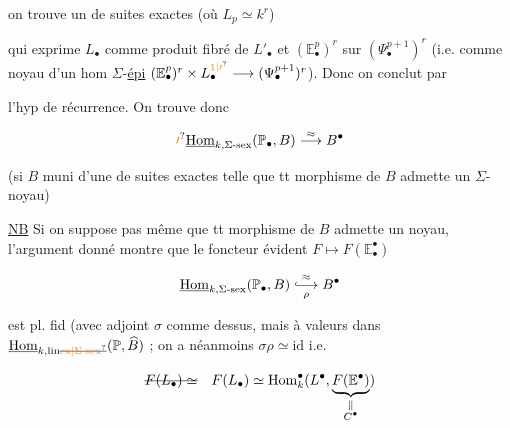 on trouve un  de suites exactes (où $L_p\simeq k^r$)


qui exprime $L_{\bullet}$ comme produit fibré de $L'_{\bullet}$ et $(\mathbb E_{\bullet}^{p})^r$ sur $(\Psi_{\bullet}^{p+1})^r$ (i.e. comme noyau d'un hom  $\Sigma$-\uline{épi} $(\mathbb E_{\bullet}^{p})^{r}\times L_{\bullet}^{\unsure{1|\prime}}\longrightarrow(\Psi_{\bullet}^{p+1})^{r}$). Donc on conclut par


l'hyp de récurrence. On trouve donc

\[
 \unsure{\prime}\underline{\operatorname{Hom}}_{k,\Sigma\text{-}\mathrm{sex}}(\mathbb P_{\bullet},B)\overset{\approx}{\longrightarrow} B^{\bullet}
\]

(si $B$ muni d'une   de suites exactes telle que tt morphisme de $B$ admette un $\Sigma$-noyau)

\uline{NB} Si on  suppose  pas même que tt morphisme de $B$ admette un noyau, l'argument donné montre  que le foncteur évident $F\longmapsto F(\mathbb E_{\bullet}^{\bullet})$

\[
 \underline{\operatorname{Hom}}_{k,\Sigma\text{-}\mathrm{sex}}(\mathbb P_{\bullet},B)\underset{\rho}{\overset{\approx}{\lhook\joinrel\longrightarrow}}B^{\bullet}
\]

est pl. fid (avec adjoint $\sigma$ comme dessus, mais à valeurs dans $\underline{\operatorname{Hom}}_{k,\mathrm{lin}\deleted{\unsure{\mathrm{ex}|\Sigma\text{-}\mathrm{sex}}}}(\mathbb P,\widehat B)$ ; on a néanmoins $\sigma\rho\simeq\mathrm{id}$ i.e.

\[
 \deleted{F(L_{\bullet})\simeq}\quad F(L_{\bullet})\simeq\operatorname{Hom}^{\bullet}_{k}(L^{\bullet},\underbrace{F(\mathbb E^{\bullet})}_{\substack{\Vert\\C^{\bullet}}})
\]

